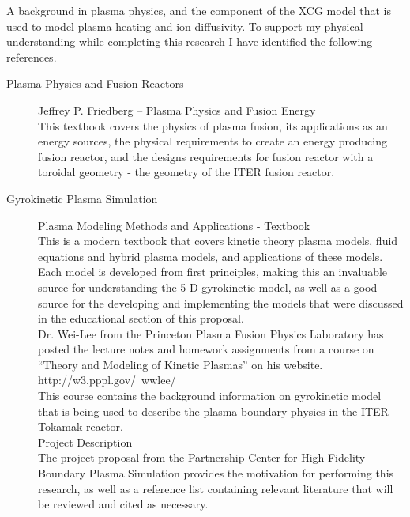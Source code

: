 \documentclass{article}
\begin{document}
A background in plasma physics, and the component of the XCG model that is used to model plasma heating and ion diffusivity. To support my physical understanding while completing this research I have identified the following references.\\
\begin{description} %

\item[Plasma Physics and Fusion Reactors]\hfill

Jeffrey P. Friedberg – Plasma Physics and Fusion Energy\\
This textbook covers the physics of plasma fusion, its applications as an energy sources, the physical requirements to create an energy producing fusion reactor, and the designs requirements for fusion reactor with a toroidal geometry - the geometry of the ITER fusion reactor.\\

\item[Gyrokinetic Plasma Simulation]\hfill

Plasma Modeling Methods and Applications - Textbook\\
This is a modern textbook that covers kinetic theory plasma models, fluid equations and hybrid plasma models, and applications of these models. Each model is developed from first principles, making this an invaluable source for understanding the 5-D gyrokinetic model, as well as a good source for the developing and implementing the models that were discussed in the educational section of this proposal.\\

Dr. Wei-Lee from the Princeton Plasma Fusion Physics Laboratory has posted the lecture notes and homework assignments from a course on “Theory and Modeling of Kinetic Plasmas” on his website.\\
http://w3.pppl.gov/~wwlee/\\
This course contains the background information on gyrokinetic model that is being used to describe the plasma boundary physics in the ITER Tokamak reactor. \\
Project Description\\
The project proposal from the Partnership Center for High-Fidelity Boundary Plasma Simulation provides the motivation for performing this research, as well as a reference list containing relevant literature that will be reviewed and cited as necessary. \\


\end{description}
\end{document}
